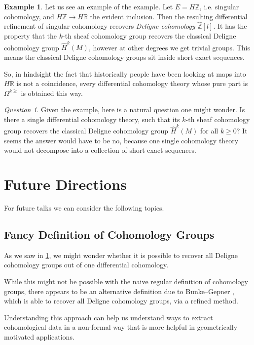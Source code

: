 \documentclass[a4paper]{book}
\newcommand{\bR}{\mathbb{R}}
\newcommand{\bZ}{\mathbb{Z}}
\theoremstyle{definition}
\newtheorem{example}[equation]{Example}
\theoremstyle{remark}
\newtheorem{question}[equation]{Question}
\numberwithin{equation}{section}
\begin{document}
\begin{example}
 Let us see an example of the example. Let $E = H\bZ$, i.e. singular cohomology, and $H\bZ \to H\bR$ the evident inclusion. Then the resulting differential refinement of singular cohomology recovers \emph{Deligne cohomology} $\hat{\bZ}[l]$. It has the property that the $k$-th sheaf cohomology group recovers the classical Deligne cohomology group $\hat{H}^k(M)$, however at other degrees we get trivial groups. This means the classical Deligne cohomology groups sit inside short exact sequences.
\end{example}

So, in hindsight the fact that historically people have been looking at maps into $H\bR$ is not a coincidence, every differential cohomology theory whose pure part is $\Omega^{k \geq}$ is obtained this way.

\begin{question} \label{que:deligne}
 Given the example, here is a natural question one might wonder. Is there a single differential cohomology theory, such that its $k$-th sheaf cohomology group recovers the classical Deligne cohomology group $\hat{H}^k(M)$ for all $k \geq 0$? It seems the answer would have to be no, because one single cohomology theory would not decompose into a collection of short exact sequences.
\end{question}


\section{Future Directions}
For future talks we can consider the following topics.

\subsection{Fancy Definition of Cohomology Groups}

As we saw in \cref{que:deligne}, we might wonder whether it is possible to recover all Deligne cohomology groups out of one differential cohomology. 

While this might not be possible with the naive regular definition of cohomology groups, there appears to be an alternative definition due to Bunke--Gepner \cite{bunkegepner2021diffktheory}, which is able to recover all Deligne cohomology groups, via a refined method.

Understanding this approach can help us understand ways to extract cohomological data in a non-formal way that is more helpful in geometrically motivated applications.
\end{document}
